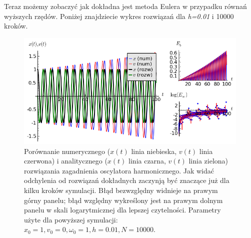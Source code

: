 \documentclass[a4paper,12pt,polish]{sphinxmanual}
\begin{document}
Teraz możemy zobaczyć jak dokładna jest metoda Eulera w przypadku równań wyższych rzędów. Poniżej
znajdziecie wykres rozwiązań dla \emph{h=0.01} i 10000 kroków.
\begin{figure}[htbp]
\centering
\capstart

\includegraphics{euler_osc.png}
\caption{Porównanie numerycznego ($x(t)$ linia niebieska, $v(t)$ linia czerwona)
i analitycznego ($x(t)$ linia czarna, $v(t)$ linia zielona) rozwiązania zagadnienia
oscylatora harmonicznego. Jak widać odchylenia od rozwiązań dokładnych zaczynją być
znaczące już dla kilku kroków symulacji.
Błąd bezwzględny widnieje na prawym górny panelu; błąd względny wykreślony jest na prawym dolnym
panelu w skali logarytmicznej dla lepszej czytelności.
Parametry użyte dla powyższej symulacji: $x_0=1, v_0=0, \omega_0=1, h=0.01, N=10000$.}\end{figure}
\end{document}
